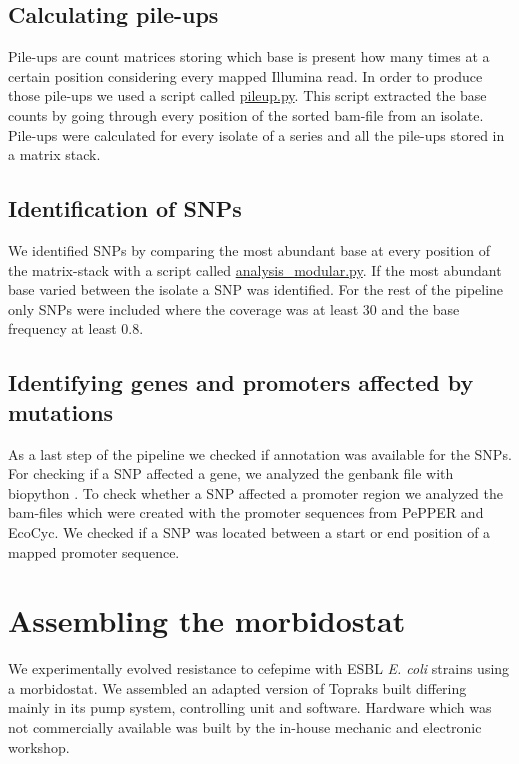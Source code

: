 \subsection{Calculating pile-ups}
Pile-ups are count matrices storing which base is present how many times at a certain position considering every mapped Illumina read. In order to produce those pile-ups we used a script called \href{https://github.com/nahanoo/ESBL\_project/pileup.py}{pileup.py}. This script extracted the base counts by going through every position of the sorted bam-file from an isolate. Pile-ups were calculated for every isolate of a series and all the pile-ups stored in a matrix stack.

\subsection{Identification of SNPs} 
We identified SNPs by comparing the most abundant base at every position of the matrix-stack with a script called \href{https://github.com/nahanoo/ESBL\_project/pileup.py}{analysis\_modular.py}. If the most abundant base varied between the isolate a SNP was identified. For the rest of the pipeline only SNPs were included where the coverage was at least 30 and the base frequency at least 0.8.

\subsection{Identifying genes and promoters affected by mutations}
As a last step of the pipeline we checked if annotation was available for the SNPs. For checking if a SNP affected a gene, we analyzed the genbank file with biopython \cite{cock_biopython:_2009}. To check whether a SNP affected a promoter region we analyzed the bam-files which were created with the promoter sequences from PePPER and EcoCyc. We checked if a SNP was located between a start or end position of a mapped promoter sequence. 

\section{Assembling the morbidostat}
We experimentally evolved resistance to cefepime with ESBL \textit{E. coli} strains using a morbidostat. We assembled an adapted version of Topraks built differing mainly in its pump system, controlling unit and software\cite{toprak_building_2013}. Hardware which was not commercially available was built by the in-house mechanic and electronic workshop.

